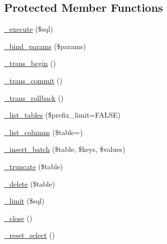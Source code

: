 \subsection*{Protected Member Functions}
\begin{DoxyCompactItemize}
\item 
\mbox{\hyperlink{class_c_i___d_b__oci8__driver_a114ab675d89bf8324a41785fb475e86d}{\+\_\+execute}} (\$sql)
\item 
\mbox{\hyperlink{class_c_i___d_b__oci8__driver_a66b8b06dadf7ff16c3877d5c024f5d2b}{\+\_\+bind\+\_\+params}} (\$params)
\item 
\mbox{\hyperlink{class_c_i___d_b__oci8__driver_ac81ac882c1d54347d810199a15856aac}{\+\_\+trans\+\_\+begin}} ()
\item 
\mbox{\hyperlink{class_c_i___d_b__oci8__driver_a6fe7f373e0b11cfae23a5f41c0b35dda}{\+\_\+trans\+\_\+commit}} ()
\item 
\mbox{\hyperlink{class_c_i___d_b__oci8__driver_ad49a116b0776c26b53114c9093fd102a}{\+\_\+trans\+\_\+rollback}} ()
\item 
\mbox{\hyperlink{class_c_i___d_b__oci8__driver_a435c0f3ce54fe7daa178baa8532ebd54}{\+\_\+list\+\_\+tables}} (\$prefix\+\_\+limit=F\+A\+L\+SE)
\item 
\mbox{\hyperlink{class_c_i___d_b__oci8__driver_a7ccb7f9c301fe7f0a9db701254142b63}{\+\_\+list\+\_\+columns}} (\$table=\textquotesingle{}\textquotesingle{})
\item 
\mbox{\hyperlink{class_c_i___d_b__oci8__driver_a1978e1358c812587a46e242630365099}{\+\_\+insert\+\_\+batch}} (\$table, \$keys, \$values)
\item 
\mbox{\hyperlink{class_c_i___d_b__oci8__driver_aa029600528fc1ce660a23ff4b4667f95}{\+\_\+truncate}} (\$table)
\item 
\mbox{\hyperlink{class_c_i___d_b__oci8__driver_a133ea8446ded52589bd22cc9163d0896}{\+\_\+delete}} (\$table)
\item 
\mbox{\hyperlink{class_c_i___d_b__oci8__driver_a3a02ea06541b8ecc25a33a61651562c8}{\+\_\+limit}} (\$sql)
\item 
\mbox{\hyperlink{class_c_i___d_b__oci8__driver_a4d9082658000e5ede8312067c6dda9db}{\+\_\+close}} ()
\item 
\mbox{\hyperlink{class_c_i___d_b__oci8__driver_a7c6cc16411b9c36fbfd42a9317f64317}{\+\_\+reset\+\_\+select}} ()
\end{DoxyCompactItemize}
